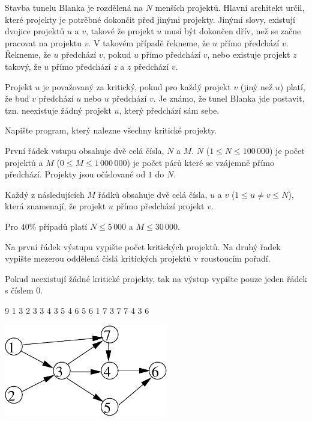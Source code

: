 





Stavba tunelu Blanka je rozdělená na $N$ menších projektů.
Hlavní architekt určil, které projekty je potrěbné dokončit před jinými projekty.
Jinými slovy, existují dvojice projektů $u$ a $v$, takové že projekt $u$ musí být dokončen dřív, než se začne pracovat na projektu $v$.
V takovém případě řekneme, že $u$ přímo předchází $v$.
Řekneme, že $u$ předchází $v$, pokud $u$ přímo předchází $v$, nebo existuje projekt $z$ takový, že $u$ přímo předchází $z$ a $z$ předchází $v$.

Projekt $u$ je považovaný za kritický, pokud pro každý projekt $v$ (jiný než $u$) platí, že buď $v$ předchází $u$ nebo $u$ předchází $v$.
Je známo, že tunel Blanka jde postavit, tzn. neexistuje žádný projekt $u$, který předchází sám sebe.


Napište program, který nalezne všechny kritické projekty.


První řádek vstupu obsahuje dvě celá čísla, $N$ a $M$.
$N$ ($1 \leq N \leq 100\,000$) je počet projektů a $M$ ($0 \leq M \leq 1\,000\,000$) je počet párů které se vzájemně přímo předchází.
Projekty jsou očíslované od $1$ do $N$.

Každý z následujících $M$ řádků obsahuje dvě celá čísla, $u$ a $v$ ($1 \leq u \neq v \leq N$), která znamenají, že projekt $u$ přímo předchází projekt $v$.

\smallskip
Pro $40 \%$ případů platí $N \leq 5\,000$ a $M \leq 30\,000$.


Na první řádek výstupu vypište počet kritických projektů. Na druhý řadek vypište mezerou oddělená číslá kritických projektů v roustoucím pořadí.

Pokud neexistují žádné kritické projekty, tak na výstup vypište pouze jeden řádek s číslem 0.


 9
1 3
2 3
3 4
3 5
4 6
5 6
1 7
3 7
7 4
3 6
\sampleCOMMENT

\sampleEND

\includegraphics[height=4cm]{img/critical-fig.pdf}
\bigskip



